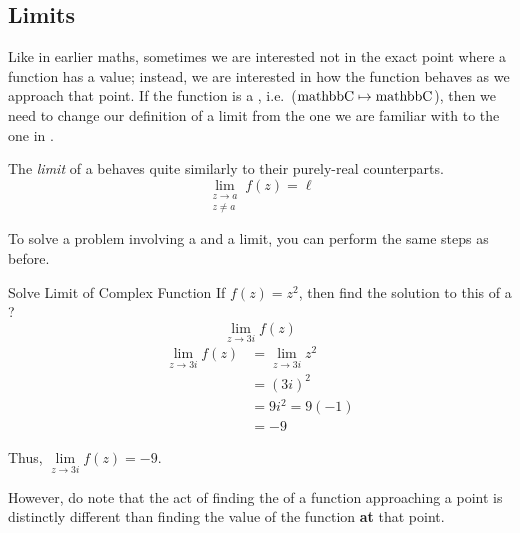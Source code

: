 \subsection{Limits}\label{subsec:Limits}
Like in earlier maths, sometimes we are interested not in the exact point where a function has a value; instead, we are interested in how the function behaves as we approach that point.
If the function is a , i.e.\ ($\operatorname{mathbb{C}} \mapsto \operatorname{mathbb{C}}$), then we need to change our definition of a limit from the one we are familiar with to the one in .

\begin{definition}[Limit]\label{def:Complex_Limit}
  The \emph{limit} of a  behaves quite similarly to their purely-real counterparts.
  \begin{equation}\label{eq:Complex_Limit}
    \lim\limits_{\substack{z \to a \\ z \neq a}} f(z) = \ell
  \end{equation}
\end{definition}

To solve a problem involving a  and a limit, you can perform the same steps as before.

\begin{example}[Lecture 5]{Solve Limit of Complex Function}
  If $f(z) = z^{2}$, then find the solution to this  of a ?
  \begin{equation*}
    \lim\limits_{z \to 3i} f(z)
  \end{equation*}
  \tcblower{}
  \begin{align*}
    \lim\limits_{z \to 3i} f(z) &= \lim\limits_{z \to 3i} z^{2} \\
                                &= {(3i)}^{2} \\
                                &= 9 i^{2} = 9 (-1) \\
                                &= -9
  \end{align*}

  Thus, $\lim\limits_{z \to 3i} f(z) = -9$.
\end{example}

\begin{remark*}
  However, do note that the act of finding the  of a function approaching a point is distinctly different than finding the value of the function \textbf{at} that point.
\end{remark*}

